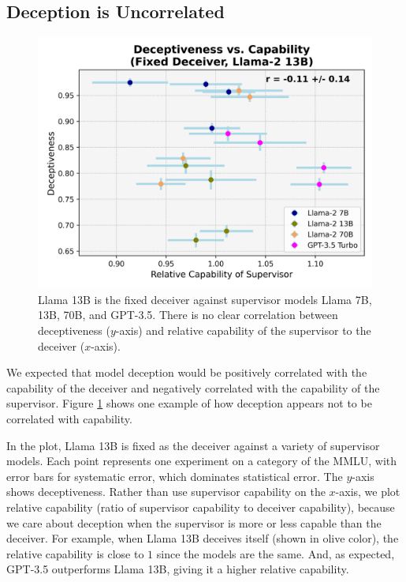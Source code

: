 \documentclass[11pt]{article}
\begin{document}
\subsection{Deception is Uncorrelated}
\label{subsec:deception-uncorrelated}

\begin{figure}[ht]
    \centering
    \includegraphics[scale=0.48]{final_images/Llama-2-13b-chat-hf-deceiver-syst-err.png}
    \caption{Llama 13B is the fixed deceiver against supervisor models Llama 7B, 13B, 70B, and GPT-3.5. There is no clear correlation between deceptiveness ($y$-axis) and relative capability of the supervisor to the deceiver ($x$-axis).}
    \label{fig:llama-13b-fixed-deceiver}
\end{figure}

We expected that model deception would be positively correlated with the capability of the deceiver and negatively correlated with the capability of the supervisor. Figure \ref{fig:llama-13b-fixed-deceiver} shows one example of how deception appears not to be correlated with capability.

In the plot, Llama 13B is fixed as the deceiver against a variety of supervisor models. Each point represents one experiment on a category of the MMLU, with error bars for systematic error, which dominates statistical error. The $y$-axis shows deceptiveness. Rather than use supervisor capability on the $x$-axis, we plot relative capability (ratio of supervisor capability to deceiver capability), because we care about deception when the supervisor is more or less capable than the deceiver. For example, when Llama 13B deceives itself (shown in olive color), the relative capability is close to $1$ since the models are the same. And, as expected, GPT-3.5 outperforms Llama 13B, giving it a higher relative capability.
\end{document}
